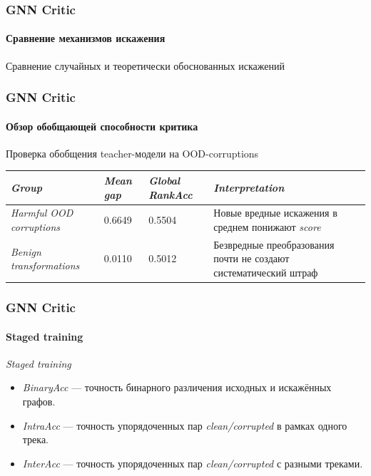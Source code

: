 \documentclass[aspectratio=169]{beamer}
\newcommand{\MetricLegend}{%
\vfill
{\fontsize{6.8}{8}\selectfont
	\begin{itemize}
		\setlength{\itemsep}{0.01cm}
		\item \textit{BinaryAcc} --- точность бинарного различения исходных и искажённых графов.
		\item \textit{IntraAcc} --- точность упорядоченных пар \textit{clean/corrupted} в рамках одного трека.
		\item \textit{InterAcc} --- точность упорядоченных пар \textit{clean/corrupted} с разными треками.
	\end{itemize}
}
}
\begin{document}
\begin{frame}
\frametitle{GNN Critic}
\framesubtitle{Сравнение механизмов искажения}
\begin{table}
\centering
\scriptsize
{\normalsize Сравнение случайных и теоретически обоснованных искажений}\\[0.25cm]
\label{tab:1}
\end{table}
\end{frame}

\begin{frame}
\frametitle{GNN Critic}
\framesubtitle{Обзор обобщающей способности критика}
\begin{table}[htbp]
{\Large Проверка обобщения teacher-модели на OOD-corruptions}\\[0.25cm]
\label{tab:ood-corruption-groups}
\centering
\small
\setlength{\tabcolsep}{4pt}
\renewcommand{\arraystretch}{1.25}
\begin{tabular}{@{}p{3.5cm}p{1.7cm}p{1cm}p{6.2cm}@{}}
\toprule
\textit{Group} & \textit{Mean gap} & \textit{Global RankAcc} & \textit{Interpretation} \\
\midrule
\textit{Harmful OOD corruptions} & 0.6649 & 0.5504 & Новые вредные искажения в среднем понижают \textit{score} \\
\textit{Benign transformations} & 0.0110 & 0.5012 & Безвредные преобразования почти не создают систематический штраф \\
\bottomrule
\end{tabular}
\end{table}
\end{frame}

\begin{frame}
\frametitle{GNN Critic}
\framesubtitle{Staged training}
\begin{table}[htbp]
\centering
{\normalsize\textit{Staged training}}\\[0.25cm]
\label{tab:3}
\scriptsize
{}
\end{table}
\MetricLegend
\end{frame}
\end{document}
